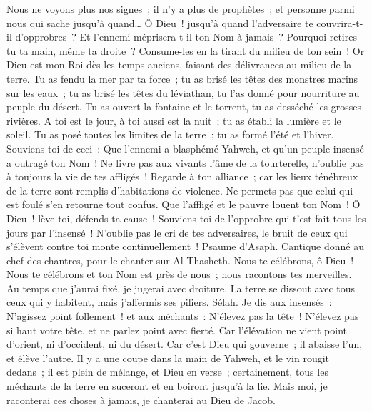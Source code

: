 \begin{multicols}{2}
Nous ne voyons plus nos signes~; il n'y a plus de prophètes~; et personne parmi nous qui sache jusqu'à quand…
Ô Dieu~! jusqu'à quand l'adversaire te couvrira-t-il d'opprobres~? Et l'ennemi méprisera-t-il ton Nom à jamais~?
Pourquoi retires-tu ta main, même ta droite~? Consume-les en la tirant du milieu de ton sein~!
Or Dieu est mon Roi dès les temps anciens, faisant des délivrances au milieu de la terre.
Tu as fendu la mer par ta force~; tu as brisé les têtes des monstres marins sur les eaux~;
tu as brisé les têtes du léviathan, tu l'as donné pour nourriture au peuple du désert.
Tu as ouvert la fontaine et le torrent, tu as desséché les grosses rivières.
A toi est le jour, à toi aussi est la nuit~; tu as établi la lumière et le soleil.
Tu as posé toutes les limites de la terre~; tu as formé l'été et l'hiver.
Souviens-toi de ceci~: Que l'ennemi a blasphémé Yahweh, et qu'un peuple insensé a outragé ton Nom~!
Ne livre pas aux vivants l'âme de la tourterelle, n'oublie pas à toujours la vie de tes affligés~!
Regarde à ton alliance~; car les lieux ténébreux de la terre sont remplis d'habitations de violence.
Ne permets pas que celui qui est foulé s'en retourne tout confus. Que l'affligé et le pauvre louent ton Nom~!
Ô Dieu~! lève-toi, défends ta cause~! Souviens-toi de l'opprobre qui t'est fait tous les jours par l'insensé~!
N'oublie pas le cri de tes adversaires, le bruit de ceux qui s'élèvent contre toi monte continuellement~!
\VerseOne{}Psaume d'Asaph. Cantique donné au chef des chantres, pour le chanter sur Al-Thasheth.
Nous te célébrons, ô Dieu~! Nous te célébrons et ton Nom est près de nous~; nous racontons tes merveilles.
Au temps que j'aurai fixé, je jugerai avec droiture.
La terre se dissout avec tous ceux qui y habitent, mais j'affermis ses piliers. Sélah.
Je dis aux insensés~: N'agissez point follement~! et aux méchants~: N'élevez pas la tête~!
N'élevez pas si haut votre tête, et ne parlez point avec fierté.
Car l'élévation ne vient point d'orient, ni d'occident, ni du désert.
Car c'est Dieu qui gouverne~; il abaisse l'un, et élève l'autre.
Il y a une coupe dans la main de Yahweh, et le vin rougit dedans~; il est plein de mélange, et Dieu en verse~; certainement, tous les méchants de la terre en suceront et en boiront jusqu'à la lie.
Mais moi, je raconterai ces choses à jamais, je chanterai au Dieu de Jacob.

\end{multicols}
